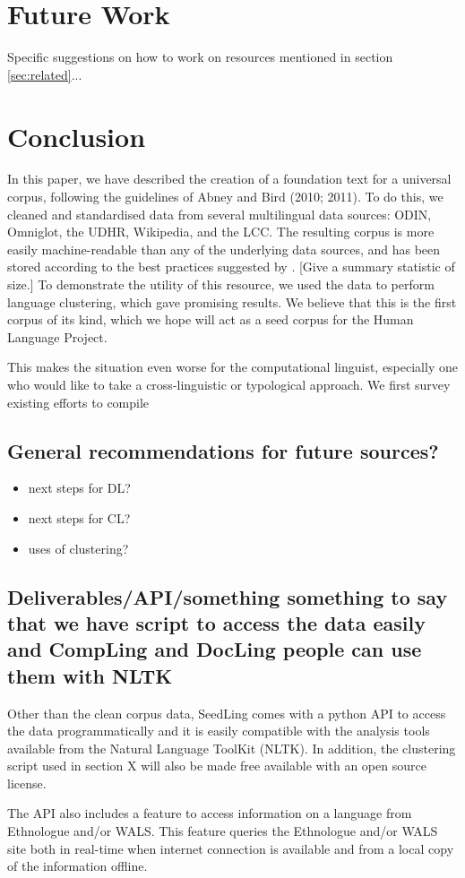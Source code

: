 
\section{Future Work} \label{sec:future}

Specific suggestions on how to work on resources mentioned in section \ref{sec:related}...


\section{Conclusion} \label{sec:conclusion}

In this paper, we have described the creation of a foundation text for a universal corpus, following the guidelines of Abney and Bird (2010; 2011). To do this, we cleaned and standardised data from several multilingual data sources: ODIN, Omniglot, the UDHR, Wikipedia, and the LCC. The resulting corpus is more easily machine-readable than any of the underlying data sources, and has been stored according to the best practices suggested by . [Give a summary statistic of size.] To demonstrate the utility of this resource, we used the data to perform language clustering, which gave promising results. We believe that this is the first corpus of its kind, which we hope will act as a seed corpus for the Human Language Project.

This makes the situation even worse for the computational linguist,
especially one who would like to take a cross-linguistic or
typological approach. We first survey existing efforts to compile


\subsection{General recommendations for future sources?}

\begin{itemize}
\item next steps for DL?
\item next steps for CL?
\item uses of clustering?
\end{itemize}


\subsection{Deliverables/API/something something to say that we have script to access the data easily and CompLing and DocLing people can use them with NLTK}
Other than the clean corpus data, SeedLing comes with a python API to access the data programmatically and it is easily compatible with the analysis tools available from the Natural Language ToolKit (NLTK). In addition, the clustering script used in section X will also be made free available with an open source license.

The API also includes a feature to access information on a language from Ethnologue and/or WALS. This feature queries the Ethnologue and/or WALS site both in real-time when internet connection is available and from a local copy of the information offline. 
